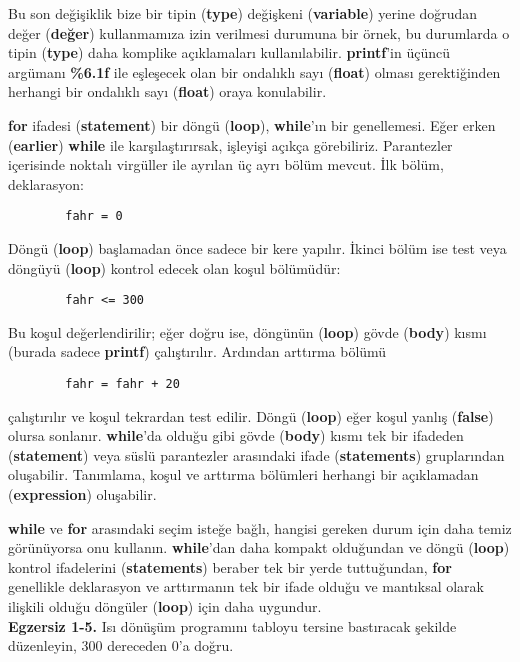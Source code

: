 \documentclass[a4paper,12pt,oneside]{book}
\begin{document}
\par Bu son değişiklik bize bir tipin (\textbf{type}) değişkeni (\textbf{variable}) yerine doğrudan değer (\textbf{değer}) kullanmamıza izin verilmesi durumuna bir örnek, bu durumlarda o tipin (\textbf{type}) daha komplike açıklamaları kullanılabilir. \textbf{printf}'in üçüncü argümanı \textbf{\%6.1f} ile eşleşecek olan bir ondalıklı sayı (\textbf{float}) olması gerektiğinden herhangi bir ondalıklı sayı (\textbf{float}) oraya konulabilir.
\par \textbf{for} ifadesi (\textbf{statement}) bir döngü (\textbf{loop}), \textbf{while}'ın bir genellemesi. Eğer erken (\textbf{earlier}) \textbf{while} ile karşılaştırırsak, işleyişi açıkça görebiliriz. Parantezler içerisinde noktalı virgüller ile ayrılan üç ayrı bölüm mevcut. İlk bölüm, deklarasyon:
\begin{lstlisting}
		fahr = 0
\end{lstlisting}
Döngü (\textbf{loop}) başlamadan önce sadece bir kere yapılır. İkinci bölüm ise test veya döngüyü (\textbf{loop}) kontrol edecek olan koşul bölümüdür:
\begin{lstlisting}
		fahr <= 300
\end{lstlisting}
Bu koşul değerlendirilir; eğer doğru ise, döngünün (\textbf{loop}) gövde (\textbf{body}) kısmı (burada sadece \textbf{printf}) çalıştırılır. Ardından arttırma bölümü
\begin{lstlisting}
		fahr = fahr + 20
\end{lstlisting}
çalıştırılır ve koşul tekrardan test edilir. Döngü (\textbf{loop}) eğer koşul yanlış (\textbf{false}) olursa sonlanır. \textbf{while}'da olduğu gibi gövde (\textbf{body}) kısmı tek bir ifadeden (\textbf{statement}) veya süslü parantezler arasındaki ifade (\textbf{statements}) gruplarından oluşabilir. Tanımlama, koşul ve arttırma bölümleri herhangi bir açıklamadan (\textbf{expression}) oluşabilir.
\par \textbf{while} ve \textbf{for} arasındaki seçim isteğe bağlı, hangisi gereken durum için daha temiz görünüyorsa onu kullanın. \textbf{while}'dan daha kompakt olduğundan ve döngü (\textbf{loop}) kontrol ifadelerini (\textbf{statements}) beraber tek bir yerde tuttuğundan, \textbf{for} genellikle deklarasyon ve arttırmanın tek bir ifade olduğu ve mantıksal olarak ilişkili olduğu döngüler (\textbf{loop}) için daha uygundur. \newline
\\ \noindent \textbf{Egzersiz 1-5.} Isı dönüşüm programını tabloyu tersine bastıracak şekilde düzenleyin, 300 dereceden 0'a doğru. \pagebreak
\end{document}
